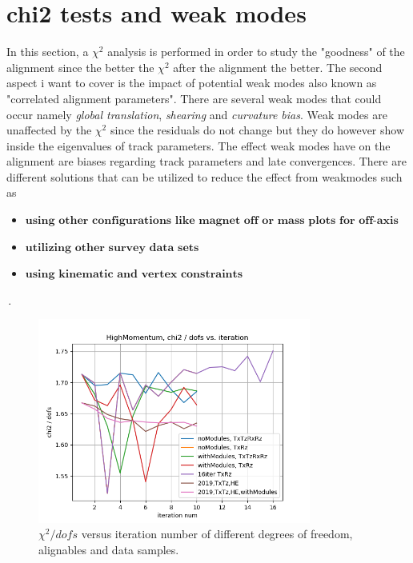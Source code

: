 \section{chi2 tests and weak modes}
In this section, a $\chi^2$ analysis is performed in order to study the "goodness" of the alignment since the better the $\chi^2$ after the alignment the better.
The second aspect i want to cover is the impact of potential weak modes also known as "correlated alignment parameters". There are several weak modes that could occur namely \textit{global translation}, \textit{shearing} and \textit{curvature bias}.
Weak modes are unaffected by the $\chi^2$ since the residuals do not change but they do however show inside the eigenvalues of track parameters.
The effect weak modes have on the alignment are biases regarding track parameters and late convergences.
There are different solutions that can be utilized to reduce the effect from weakmodes such as
\begin{itemize}
  \item $\textbf{using other configurations like magnet off or mass plots for off-axis events}$
  \item $\textbf{utilizing other survey data sets}$
  \item $\textbf{using kinematic and vertex constraints}$
\end{itemize}\,.

\begin{figure}
  \centering
  \includegraphics[width=0.8\textwidth]{plots/nov_19/Figure_2.png}
  \caption{$\chi^2 / dofs$ versus iteration number of different degrees of freedom, alignables and data samples.}
  \label{fig:fig2}
\end{figure}

